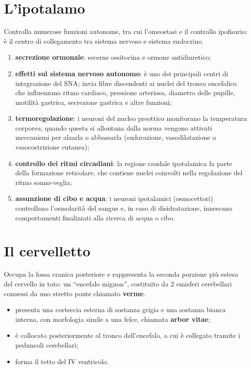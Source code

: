 \section{L'ipotalamo}

Controlla numerose funzioni autonome, tra cui l'omeostasi e il controllo
ipofisario: è il centro di collegamento tra sistema nervoso e sistema
endocrino.

\begin{enumerate}
  \item \textbf{secrezione ormonale}: secerne ossitocina e ormone
    antidiuretico;
  \item \textbf{effetti sul sistema nervoso autonomo}: è uno dei principali
    centri di integrazione del SNA; invia fibre discendenti ai nuclei del
    tronco encefalico che influenzano ritmo cardiaco, pressione arteriosa,
    diametro delle pupille, motilità gastrica, secrezione gastrica e altre
    funzioni;
  \item \textbf{termoregolazione}: i neuroni del nucleo preottico monitorano
    la temperatura corporea; quando questa si allontana dalla norma vengono
    attivati meccanismi per alzarla o abbassarla (sudorazione,
    vasodilatazione o vasocostrizione cutanea);
  \item \textbf{controllo dei ritmi circadiani}: la regione caudale
    ipotalamica fa parte della formazione reticolare, che contiene nuclei
    coinvolti nella regolazione del ritmo sonno-veglia;
  \item \textbf{assunzione di cibo e acqua}: i neuroni ipotalamici
    (osmocettori) controllano l'osmolarità del sangue e, in caso di
    disidratazione, innescano comportamenti finalizzati alla ricerca di
    acqua o cibo.
\end{enumerate}

\section{Il cervelletto}

Occupa la fossa cranica posteriore e rappresenta la seconda porzione più
estesa del cervello in toto: un ``encefalo mignon'', costituito da 2 emisferi
cerebellari connessi da uno stretto ponte chiamato \textbf{verme}.

\begin{itemize}
  \item presenta una corteccia esterna di sostanza grigia e una sostanza
    bianca interna, con morfologia simile a una felce, chiamata
    \textbf{arbor vitae};
  \item è collocato posteriormente al tronco dell'encefalo, a cui è collegato
    tramite i peduncoli cerebellari;
  \item forma il tetto del IV ventricolo.
\end{itemize}

